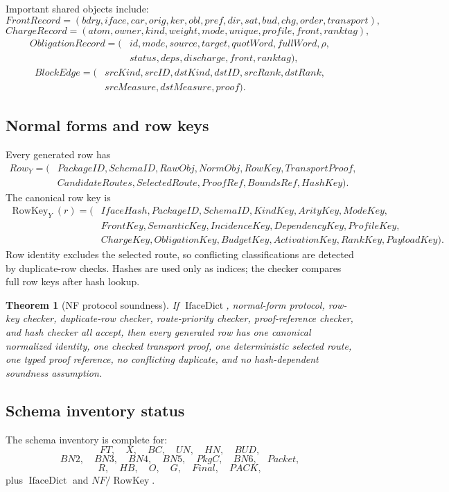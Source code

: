 \documentclass[10.5pt,a4paper]{article}
\newtheorem{theorem}{Theorem}[section]
\newcommand{\IfaceDict}{\operatorname{IfaceDict}}
\newcommand{\RowKey}{\operatorname{RowKey}}
\begin{document}
Important shared objects include:
\[
FrontRecord=(bdry,iface,car,orig,ker,obl,pref,dir,sat,bud,chg,order,transport),
\]
\[
ChargeRecord=(atom,owner,kind,weight,mode,unique,profile,front,ranktag),
\]
\[
\begin{aligned}
ObligationRecord=(&id,mode,source,target,quotWord,fullWord,\rho,\\
&status,deps,discharge,front,ranktag),
\end{aligned}
\]
\[
\begin{aligned}
BlockEdge=(&srcKind,srcID,dstKind,dstID,srcRank,dstRank,\\
&srcMeasure,dstMeasure,proof).
\end{aligned}
\]

\subsection{Normal forms and row keys}
Every generated row has
\[
\begin{aligned}
Row_Y=(&PackageID,SchemaID,RawObj,NormObj,RowKey,TransportProof,\\
&CandidateRoutes,SelectedRoute,ProofRef,BoundsRef,HashKey).
\end{aligned}
\]
The canonical row key is
\[
\begin{aligned}
\RowKey_Y(r)=(&IfaceHash,PackageID,SchemaID,KindKey,ArityKey,ModeKey,\\
&FrontKey,SemanticKey,IncidenceKey,DependencyKey,ProfileKey,\\
&ChargeKey,ObligationKey,BudgetKey,ActivationKey,RankKey,PayloadKey).
\end{aligned}
\]
Row identity excludes the selected route, so conflicting classifications are detected by duplicate-row checks. Hashes are used only as indices; the checker compares full row keys after hash lookup.

\begin{theorem}[NF protocol soundness]
If \(\IfaceDict\), normal-form protocol, row-key checker, duplicate-row checker, route-priority checker, proof-reference checker, and hash checker all accept, then every generated row has one canonical normalized identity, one checked transport proof, one deterministic selected route, one typed proof reference, no conflicting duplicate, and no hash-dependent soundness assumption.
\end{theorem}

\subsection{Schema inventory status}
The schema inventory is complete for:
\[
FT,
\quad X,
\quad BC,
\quad UN,
\quad HN,
\quad BUD,
\]
\[
BN2,
\quad BN3,
\quad BN4,
\quad BN5,
\quad PkgC,
\quad BN6,
\quad Packet,
\]
\[
R,
\quad HB,
\quad O,
\quad G,
\quad Final,
\quad PACK,
\]
plus \(\IfaceDict\) and \(NF/\RowKey\).
\end{document}
